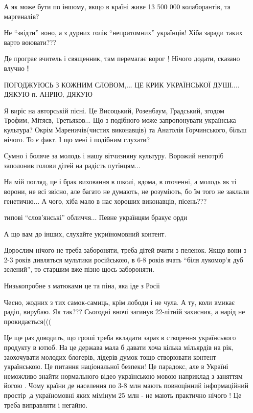 \begin{itemize}
А як може бути по іншому, якщо в країні живе 13 500 000 колаборантів, та маргеналів?

Не \enquote{звідти} воно, а з дурних голів \enquote{непритомних} українців! Хіба заради таких варто воювати???

Де програє вчитель і священник, там перемагає ворог！Нічого додати, сказано влучно！


ПОГОДЖУЮСЬ З КОЖНИМ СЛОВОМ,... ЦЕ КРИК УКРАЇНСЬКОЇ ДУШІ....
ДЯКУЮ п. АНРІЮ, ДЯКУЮ

Я виріс на авторській пісні.
Це Висоцький, Розенбаум, Градський, згодом Трофим, Мітяєв, Третьяков...
Що з подібного може запропонувати українська культура?
Окрім Мареничів(чистих виконавців) та Анатолія Горчинського, більш нічого.
То є факт.
І що мені і подібним слухати?


Сумно і боляче за молодь і нашу вітчизняну культуру. Ворожий непотріб заполонив
голови дітей на радість путінцям...


На мій погляд, це і брак виховання в школі, вдома, в оточенні, а молодь як ті
ворони, не всі звісно, але багато не думають, не розуміють, бо їм того не заклали
генетично... А чого, хіба мало в нас хороших виконавців, пісень???

типові \enquote{слов'янські} обличчя... Певне українцям бракує орди

А що вам до інших, слухайте укриїномовний контент.


Дорослим нічого не треба забороняти, треба дітей вчити з пеленок. Якщо вони з
2-3 років дивляться мультики російською, в 6-8 років вчать \enquote{біля лукомор'я дуб
зелений}, то старшим вже пізно щось забороняти.


Низькопробне з матюками це та піна, яка іде з Росіі


Чесно, жодних з тих самок-самиць, крім лободи і не чула. А ту, коли вмикає
радіо, вирубаю. Як так??? Сьогодні вночі загинув 22-літній захисник, а нарід не
прокидається(((


Це ще раз доводить, що гроші треба вкладати зараз в створення українського
продукту в ютюб. На це держава мала б давати хоча кілька мільярдів на рік,
заохочувати молодих блогерів, лідерів думок тощо створювати контент
українською. Це питання національної безпеки! Це парадокс, але в Україні
неможливо знайти нормального відео українською мовою наприклад з заняттям йогою
. Чому країни де населення по 3-8 млн мають повноцінний інформаційний простір
,а україномовні яких мімінум 25 млн - не мають практично нічого ! Це треба
виправляти і негайно.


\end{itemize}
